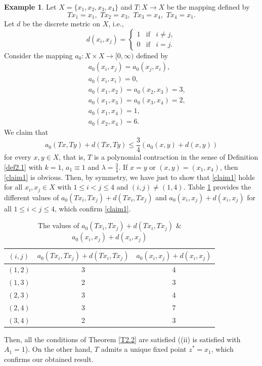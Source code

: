 \documentclass[letterpaper,12pt]{article}
\numberwithin{equation}{section}
\theoremstyle{definition}
\newtheorem{example}[theorem]{Example}
\theoremstyle{remark}
\begin{document}
\begin{example}\label{ex2.7}
Let $X=\{x_1,x_2,x_3,x_4\}$ and $T: X\to X$ be the mapping defined by 
$$
Tx_1=x_1,\,\, Tx_2=x_3,\,\, Tx_3=x_4,\,\, Tx_4=x_1. 
$$ 
Let $d$ be the discrete metric on $X$, i.e., 
$$
d(x_i,x_j)=\left\{\begin{array}{llll}
1 &\mbox{if}& i\neq j,\\[4pt]
0  &\mbox{if}& i=j. 	
\end{array}
\right.
$$
Consider the mapping $a_0: X\times X\to [0,\infty)$ defined by 
\begin{eqnarray*}
&&a_0(x_i,x_j)=a_0(x_j,x_i),\\
&&a_0(x_i,x_i)=0,\\
&&a_0(x_1,x_2)=a_0(x_2,x_3)=3,\\
&&a_0(x_1,x_3)=a_0(x_3,x_4)=2,\\
&& a_0(x_1,x_4)=1,\\
&&a_0(x_2,x_4)=6.  
\end{eqnarray*}
We claim that 
\begin{equation}\label{claim1}
a_0(Tx,Ty)+d(Tx,Ty)\leq \frac{3}{4} \left(a_0(x,y)+d(x,y)\right)	
\end{equation}
for every $x,y\in X$, that is, $T$ is a polynomial contraction in the sense of Definition \ref{def2.1} with $k=1$, $a_1\equiv 1$ and $\lambda=\frac{3}{4}$. If $x=y$ or $(x,y)=(x_1,x_4)$, then \eqref{claim1} is obvious. Then, by symmetry, we have just to show that \eqref{claim1} holds for all $x_i,x_j\in X$ with $1\leq i<j\leq 4$ and $(i,j)\neq (1,4)$. Table \ref{Tb} provides the different values of $a_0(Tx_i,Tx_j)+d(Tx_i,Tx_j)$ and  $a_0(x_i,x_j)+d(x_i,x_j)$ for all  $1\leq i<j\leq 4$, which confirm \eqref{claim1}. 
\begin{table}[htt!]
\begin{center}
\begin{tabular}{|c | c | c |}
  \hline			
  $(i,j)$ & $a_0(Tx_i,Tx_j)+d(Tx_i,Tx_j)$  & $a_0(x_i,x_j)+d(x_i,x_j)$ \\
  \hline
  $(1,2)$ & 3 & 4 \\
  \hline
  $(1,3)$ & 2 & 3 \\
  \hline 
 $(2,3)$ & 3 & 4 \\
  \hline 
  $(2,4)$ & 3 & 7 \\
  \hline 
  $(3,4)$ & 2 & 3 \\
  \hline 
\end{tabular}
\caption{The values of $a_0(Tx_i,Tx_j)+d(Tx_i,Tx_j)$ \& $a_0(x_i,x_j)+d(x_i,x_j)$}\label{Tb}
\end{center}
\end{table}
Then, all the conditions of Theorem \ref{T2.2} are satisfied ((ii) is satisfied with $A_1=1$). On the other hand, $T$ admits a unique fixed point $z^*=x_1$, which confirms our obtained result. 


\end{example}
\end{document}
